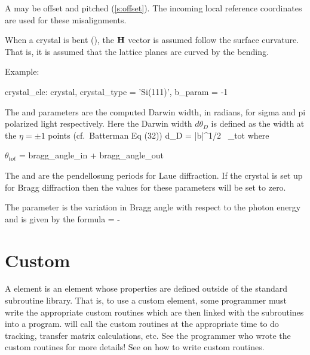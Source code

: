 A  may be offset and pitched (\ref{s:offset}). The incoming
local reference coordinates are used for these misalignments. 

When a crystal is bent (), the ${\bf H}$ vector is
assumed follow the surface curvature. That is, it is assumed that the
lattice planes are curved by the bending.

Example:
\begin{example}
  crystal_ele: crystal, crystal_type = 'Si(111)', b_param = -1
\end{example}

The  and  parameters are
the computed Darwin width, in radians, for sigma and pi polarized
light respectively. Here the Darwin width $d\theta_D$ is defined as
the width at the $\eta = \pm 1$ points
(cf.~Batterman\cite{b:batterman} Eq (32))
\Begineq
  d\theta_D = 
                 {|b|^{1/2} \, \sin\theta_{tot}}
\Endeq
where
\begin{example}
  \(\theta_{tot}\) = bragg_angle_in + bragg_angle_out 
\end{example}

The  and  are
the pendellosung periods for Laue diffraction. If the crystal is set up for
Bragg diffraction then the values for these parameters will be set to zero.

The  parameter is the variation in Bragg angle
with respect to the photon energy and is given by the formula
\Begineq
   = -
\Endeq

\section{Custom}
\label{s:custom}

A  element is an element whose properties are defined
outside of the standard \bmad subroutine library. That is, to use a
custom element, some programmer must write the appropriate custom
routines which are then linked with the \bmad subroutines into a
program. \bmad will call the custom routines at the appropriate time
to do tracking, transfer matrix calculations, etc. See the programmer
who wrote the custom routines for more details! See
 on how to write custom routines.

